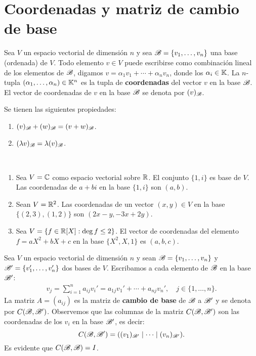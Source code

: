 \section{Coordenadas y matriz de cambio de base}

\begin{block}
    Sea $V$ un espacio vectorial de dimensión $n$ y sea $\mathscr{B}=\{v_1,\dots,v_n\}$
    una base (ordenada) de $V$. Todo elemento $v\in V$ puede escribirse como
    combinación lineal de los elementos de $\mathscr{B}$, digamos
    $v=\alpha_1v_1+\cdots+\alpha_n v_n$, donde los $\alpha_i\in\mathbb{K}$. La
    $n$-tupla $(\alpha_1,\dots,\alpha_n)\in\mathbb{K}^n$ es la tupla de
    \textbf{coordenadas} del vector $v$ en la base $\mathscr{B}$. El vector de
    coordenadas de $v$ en la base $\mathscr{B}$ se denota por $(v)_{\mathscr{B}}$.
\end{block}

\begin{remark}
	Se tienen las siguientes propiedades:
	\begin{enumerate}
		\item $(v)_{\mathscr{B}}+(w)_{\mathscr{B}}=(v+w)_{\mathscr{B}}$.
		\item $(\lambda v)_{\mathscr{B}}=\lambda(v)_{\mathscr{B}}$.
	\end{enumerate}
\end{remark}

\begin{examples}\
	\begin{enumerate}
		\item Sea $V=\mathbb{C}$ como espacio vectorial sobre $\mathbb{R}$. El conjunto
			$\{1,i\}$ es base de $V$.  Las coordenadas de $a+bi$ en la base
			$\{1,i\}$ son $(a,b)$.
		\item Sean $V=\mathbb{R}^2$. Las coordenadas de un vector $(x,y)\in V$ en la
			base $\{(2,3),(1,2)\}$ son $(2x-y,-3x+2y)$.
		\item Sea $V=\{f\in\mathbb{R}[X]:\deg f\leq2\}$. El vector de coordenadas
			del elemento $f=aX^2+bX+c$ en la base $\{X^2,X,1\}$ es $(a,b,c)$.
	\end{enumerate}
\end{examples}

\begin{block}
	Sea $V$ un espacio vectorial de dimensión $n$ y sean
	$\mathscr{B}=\{v_1,\dots,v_n\}$ y $\mathscr{B}'=\{v_1',\dots,v_n'\}$ dos bases de
	$V$. Escribamos a cada elemento de $\mathscr{B}$ en la base $\mathscr{B}'$:
	\begin{align*}
		v_j=\sum_{i=1}^n a_{ij}v_i'=a_{1j}v_1'+\cdots+a_{nj}v_n',\quad j\in\{1,\dots,n\}.
	\end{align*}
	La matriz $A=(a_{ij})$ es la matriz de \textbf{cambio de base} de $\mathscr{B}$ a
	$\mathscr{B}'$ y se denota por $C(\mathscr{B},\mathscr{B}')$. 
	Observemos que las columnas de la matriz $C(\mathscr{B},\mathscr{B}')$ son las coordenadas
	de los $v_i$ en la base $\mathscr{B}'$, es decir:
	\[
		C(\mathscr{B},\mathscr{B}')=( (v_1)_{\mathscr{B}'}\mid\dots\mid (v_n)_{\mathscr{B}'}).
	\]
	Es evidente que $C(\mathscr{B},\mathscr{B})=I$.
\end{block}

